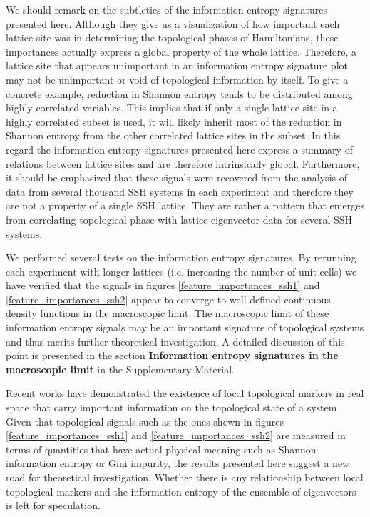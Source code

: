 \documentclass[fleqn,10pt]{wlscirep}
\begin{document}
We should remark on the subtleties of the information entropy signatures presented here. Although they give us a visualization of how important each lattice site was in determining the topological phases of Hamiltonians, these importances actually express a global property of the whole lattice. Therefore, a lattice site that appears unimportant in an information entropy signature plot may not be unimportant or void of topological information by itself. To give a concrete example, reduction in Shannon entropy tends to be distributed among highly correlated variables. This implies that if only a single lattice site in a highly correlated subset is used, it will likely inherit most of the reduction in Shannon entropy from the other correlated lattice sites in the subset. In this regard the information entropy signatures presented here express a summary of relations between lattice sites and are therefore intrinsically global. Furthermore, it should be emphasized that these signals were recovered from the analysis of data from several thousand SSH systems in each experiment and therefore they are not a property of a single SSH lattice. They are rather a pattern that emerges from correlating topological phase with lattice eigenvector data for several SSH systems.   

We performed several tests on the information entropy signatures. By rerunning each experiment with longer lattices (i.e. increasing the number of unit cells) we have verified that the signals in figures \ref{feature_importances_ssh1} and \ref{feature_importances_ssh2} appear to converge to well defined continuous density functions in the macroscopic limit. The macroscopic limit of these information entropy signals may be an important signature of topological systems and thus merits further theoretical investigation. A detailed discussion of this point is presented in the section \textbf{Information entropy signatures in the macroscopic limit} in the Supplementary Material.

Recent works have demonstrated the existence of local topological markers in real space that carry important information on the topological state of a system \cite{PhysRevB.84.241106,caio2019topological}.  Given that topological signals such as the ones shown in figures \ref{feature_importances_ssh1} and \ref{feature_importances_ssh2} are measured in terms of quantities that have actual physical meaning such as Shannon information entropy or Gini impurity, the results presented here suggest a new road for theoretical investigation. Whether there is any relationship between local topological markers and the information entropy of the ensemble of eigenvectors is left for speculation.
\end{document}
